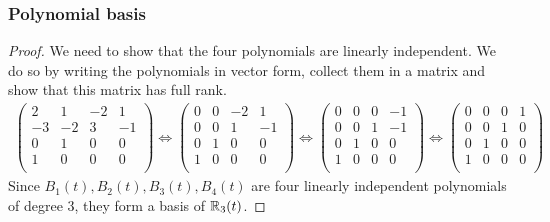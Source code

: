 \subsubsection{Polynomial basis}
\label{A:polynomial_basis}
\Basis*
\begin{proof}
We need to show that the four polynomials are linearly independent. We do so by writing the polynomials in vector form, collect them in a matrix and show that this matrix has full rank. 
\begin{align*}
\begin{pmatrix}
2 & 1 & -2 & 1\\
-3 & -2 & 3 & -1 \\
0 & 1 & 0 & 0 \\
1 & 0 & 0 & 0 \\
\end{pmatrix}
\Leftrightarrow
\begin{pmatrix}
0 & 0 & -2 & 1\\
0 & 0 & 1 & -1 \\
0 & 1 & 0 & 0 \\
1 & 0 & 0 & 0 \\
\end{pmatrix}
\Leftrightarrow
\begin{pmatrix}
0 & 0 & 0 & -1\\
0 & 0 & 1 & -1 \\
0 & 1 & 0 & 0 \\
1 & 0 & 0 & 0 \\
\end{pmatrix}
\Leftrightarrow
\begin{pmatrix}
0 & 0 & 0 & 1\\
0 & 0 & 1 & 0 \\
0 & 1 & 0 & 0 \\
1 & 0 & 0 & 0 \\
\end{pmatrix}
\end{align*}
Since $B_1(t), B_2(t), B_3(t), B_4(t)$ are four linearly independent polynomials of degree 3, they form a basis of $\mathbb{R}_3(t)$. 
\end{proof} 
